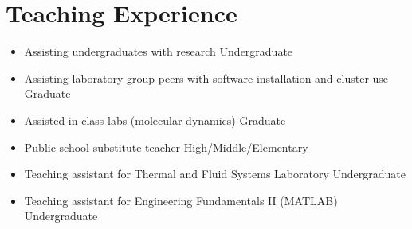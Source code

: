 \section{Teaching Experience}

\begin{itemize}
    \item Assisting undergraduates with research \hfill Undergraduate
    \item Assisting laboratory group peers with software installation and cluster use \hfill Graduate
    \item Assisted in class labs (molecular dynamics) \hfill Graduate
    \item Public school substitute teacher \hfill High/Middle/Elementary
    \item Teaching assistant for Thermal and Fluid Systems Laboratory \hfill Undergraduate
    \item Teaching assistant for Engineering Fundamentals II (MATLAB) \hfill Undergraduate
\end{itemize}
